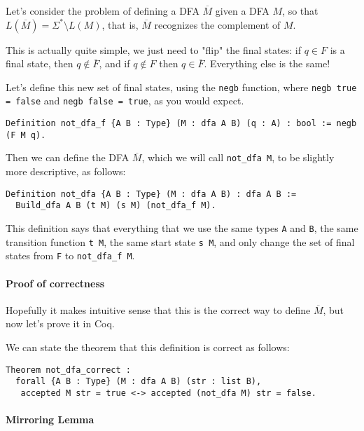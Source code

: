 Let's consider the problem of defining a DFA $\overline{M}$ given a DFA $M$, so that $L(\overline{M}) = \Sigma^* \setminus L(M)$, that is, $\overline{M}$ recognizes the complement of $M$.

This is actually quite simple, we just need to "flip" the final states: if $q \in F$ is a final state, then $q \not\in \overline{F}$, and if $q \not\in F$ then $q \in \overline{F}$.
Everything else is the same!

Let's define this new set of final states, using the \texttt{negb} function, where \texttt{negb true = false} and \texttt{negb false = true}, as you would expect.

\begin{verbatim}
Definition not_dfa_f {A B : Type} (M : dfa A B) (q : A) : bool := negb (F M q).
\end{verbatim}

Then we can define the DFA $\overline{M}$, which we will call \texttt{not_dfa M}, to be slightly more descriptive, as follows:

\begin{verbatim}
Definition not_dfa {A B : Type} (M : dfa A B) : dfa A B :=
  Build_dfa A B (t M) (s M) (not_dfa_f M).
\end{verbatim}

This definition says that everything that we use the same types \texttt{A} and \texttt{B}, the same transition function \texttt{t M}, the same start state \texttt{s M}, and only change the set of final states from \texttt{F} to \texttt{not_dfa_f M}.

\paragraph{Proof of correctness}

Hopefully it makes intuitive sense that this is the correct way to define $\overline{M}$, but now let's prove it in Coq.

We can state the theorem that this definition is correct as follows:

\begin{verbatim}
Theorem not_dfa_correct :
  forall {A B : Type} (M : dfa A B) (str : list B),
   accepted M str = true <-> accepted (not_dfa M) str = false.
\end{verbatim}

\paragraph{Mirroring Lemma}

